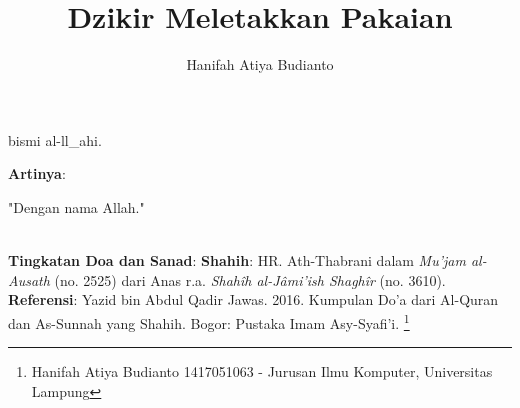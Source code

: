 \documentclass[a4paper,12pt]{article}
\title{\Large Dzikir Meletakkan Pakaian}
\author{\calligra Hanifah Atiya Budianto}
\begin{document}
\sffamily
\maketitle 
\fullvocalize
{}
\begin{arabtext}
\noindent
bismi al-ll_ahi.\\
\end{arabtext}
\noindent
\textbf{Artinya}:
\par
\indent
"Dengan nama Allah."\\\\
\par
\noindent
\textbf{Tingkatan Doa dan Sanad}: \textbf{Shahih}: HR. Ath-Thabrani dalam
\textit{Mu'jam al-Ausath} (no. 2525) dari Anas r.a. \textit{Shah\^{i}h 
al-J\^{a}mi'ish Shagh\^{i}r} (no. 3610). \\
\textbf{Referensi}: Yazid bin Abdul Qadir Jawas. 2016. Kumpulan Do'a dari
Al-Quran dan As-Sunnah yang Shahih. Bogor: Pustaka Imam Asy-Syafi'i.
\footnote{Hanifah Atiya Budianto 1417051063 - Jurusan Ilmu Komputer,
Universitas Lampung}
\end{document}
